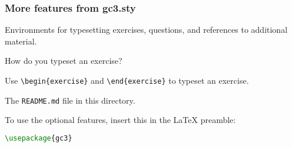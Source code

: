 \documentclass[english,serif,mathserif,usenames,dvipsnames]{beamer}
\begin{document}
\begin{frame}[fragile]
  \frametitle{More features from gc3.sty}

  Environments for typesetting exercises, questions, and references to additional material.

  \begin{question}
    How do you typeset an exercise?
  \end{question}

  \+
  \begin{exercise}
    Use \lstinline|\begin{exercise}| and \lstinline|\end{exercise}| to
    typeset an exercise.
  \end{exercise}

  \begin{seealso}
    The \texttt{README.md} file in this directory.
  \end{seealso}

  \+
  To use the optional features, insert this in the \LaTeX{} preamble:
\begin{lstlisting}[language=tex]
\usepackage{gc3}
\end{lstlisting}
\end{frame}
\end{document}
